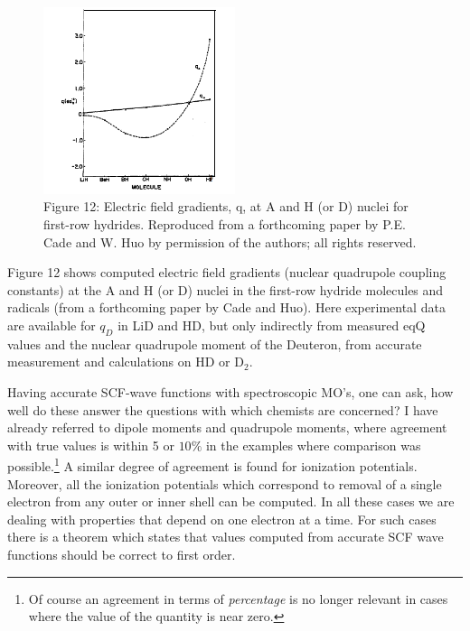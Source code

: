 \documentclass[11pt]{memoir}
\begin{document}
\begin{figure}
\begin{center}
\includegraphics[width=0.5\textwidth]{images/mulliken_figure12.png}
\end{center}
\caption*{Figure 12: Electric field gradients, q, at A and H (or D) nuclei for first-row hydrides.  Reproduced from a forthcoming paper by P.E. Cade and W. Huo by permission of the authors; all rights reserved.}
\end{figure}

Figure 12 shows computed electric field gradients (nuclear quadrupole coupling constants) at the A and H (or D) nuclei in the first-row hydride molecules and radicals (from a forthcoming paper by Cade and Huo).  Here experimental data are available for $q_D$ in LiD and HD, but only indirectly from measured eqQ values and the nuclear quadrupole moment of the Deuteron, from accurate measurement and calculations on HD or $\mathrm{D_2}$.

Having accurate SCF-wave functions with spectroscopic MO's, one can ask, how well do these answer the questions with which chemists are concerned?  I have already referred to dipole moments and quadrupole moments, where agreement with true values is within 5 or $10\%$ in the examples where comparison was possible.\footnote{Of course an agreement in terms of \emph{percentage} is no longer relevant in cases where the value of the quantity is near zero.}  A similar degree of agreement is found for ionization potentials.  Moreover, all the ionization potentials which correspond to removal of a single electron from any outer or inner shell can be computed.  In all these cases we are dealing with properties that depend on one electron at a time.  For such cases there is a theorem which states that values computed from accurate SCF wave functions should be correct to first order.
\end{document}
